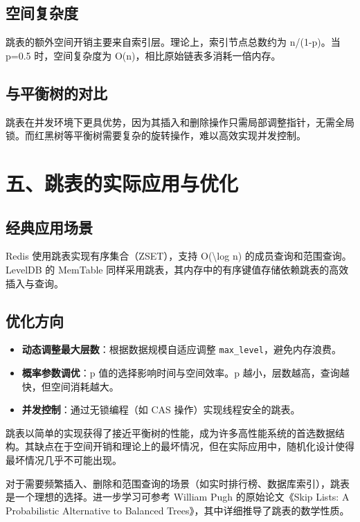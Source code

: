 \section{空间复杂度}
跳表的额外空间开销主要来自索引层。理论上，索引节点总数约为 n/(1-p)。当 p=0.5 时，空间复杂度为 O(n)，相比原始链表多消耗一倍内存。\par
\section{与平衡树的对比}
跳表在并发环境下更具优势，因为其插入和删除操作只需局部调整指针，无需全局锁。而红黑树等平衡树需要复杂的旋转操作，难以高效实现并发控制。\par
\chapter{五、跳表的实际应用与优化}
\section{经典应用场景}
Redis 使用跳表实现有序集合（ZSET），支持 O(\textbackslash{}log n) 的成员查询和范围查询。LevelDB 的 MemTable 同样采用跳表，其内存中的有序键值存储依赖跳表的高效插入与查询。\par
\section{优化方向}
\begin{itemize}
\item \textbf{动态调整最大层数}：根据数据规模自适应调整 \verb!max_level!，避免内存浪费。
\item \textbf{概率参数调优}：p 值的选择影响时间与空间效率。p 越小，层数越高，查询越快，但空间消耗越大。
\item \textbf{并发控制}：通过无锁编程（如 CAS 操作）实现线程安全的跳表。
\end{itemize}
跳表以简单的实现获得了接近平衡树的性能，成为许多高性能系统的首选数据结构。其缺点在于空间开销和理论上的最坏情况，但在实际应用中，随机化设计使得最坏情况几乎不可能出现。\par
对于需要频繁插入、删除和范围查询的场景（如实时排行榜、数据库索引），跳表是一个理想的选择。进一步学习可参考 William Pugh 的原始论文《Skip Lists: A Probabilistic Alternative to Balanced Trees》，其中详细推导了跳表的数学性质。\par
